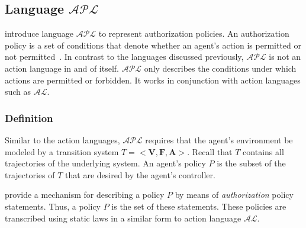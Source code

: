 \subsection{Language $\mathcal{APL}$}

\citet{gelfond_authorization_2008} introduce language $\mathcal{APL}$ to represent authorization policies.
An authorization policy is a set of conditions that denote whether an agent's action is permitted or not permitted~\citep{gelfond_authorization_2008}.
In contrast to the languages discussed previously, $\mathcal{APL}$ is not an action language in and of itself.
$\mathcal{APL}$ only describes the conditions under which actions are permitted or forbidden.
It works in conjunction with action languages such as $\mathcal{AL}$.

\subsubsection{Definition}

Similar to the action languages, $\mathcal{APL}$ requires that the agent's environment be modeled by a transition system $T=<\boldsymbol{V},\boldsymbol{F},\boldsymbol{A}>$.
Recall that $T$ contains all trajectories of the underlying system.
An agent's policy $P$ is the subset of the trajectories of $T$ that are desired by the agent's controller.

\citet{gelfond_authorization_2008} provide a mechanism for describing a policy $P$ by means of \textit{authorization} policy statements.
Thus, a policy $P$ is the set of these statements.
These policies are transcribed using static laws in a similar form to action language $\mathcal{AL}$.

